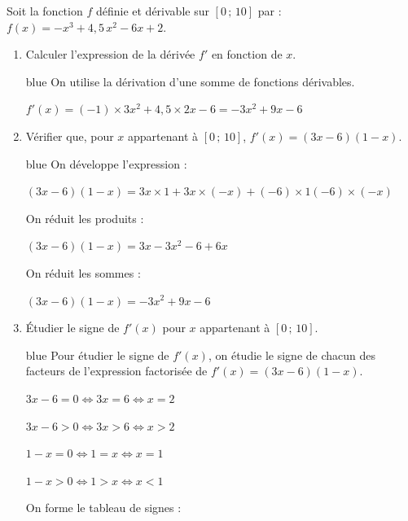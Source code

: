 Soit la fonction $f$ définie et dérivable sur $[0\,;\,10]$ par :\quad $f(x)=-x^{3}+4{,}5\,x^{2}-6x+2$.
	
	\begin{enumerate}
		\item Calculer l'expression de la dérivée $f'$ en fonction de $x$.
		
		\begin{color}{blue}
		On utilise la dérivation d'une somme de fonctions dérivables.
		
		$f'(x)=(-1)\times 3x^{2} + 4{,}5\times 2x - 6  = -3x^2 + 9x - 6$
		
		\end{color}
		
		
		\item Vérifier que, pour $x$ appartenant à $[0\,;\,10]$, $f'(x)=(3x-6)(1-x)$.

		\begin{color}{blue}
		On développe l'expression :
		
		\(
		(3x-6)(1-x) = 3x\times 1 +3x\times (-x) + (-6)\times 1 (-6)\times (-x) 
		\)
		
		On réduit les produits :
		
		\(
		(3x-6)(1-x) = 3x -3x^2 - 6 + 6x 
		\)
		
		
		On réduit les sommes :

		\(
		(3x-6)(1-x) = -3x^2 + 9x - 6  
		\)
		
				
		\end{color}
		
		\item Étudier le signe de $f'(x)$ pour $x$ appartenant à $[0\,;\,10]$.
		
		\begin{color}{blue}
		Pour étudier le signe de $f'(x)$, on étudie le signe de chacun des facteurs de l'expression factorisée de $f'(x)=(3x-6)(1-x)$.
		
		$3x - 6 = 0 \iff 3x = 6 \iff x = 2$
		
		$3x - 6 > 0 \iff 3x > 6 \iff x > 2$
		
		$1 - x = 0 \iff 1 = x \iff x = 1$
		
		$1 - x > 0 \iff 1 > x \iff x < 1$
		
		On forme le tableau de signes :
		
		
		\begin{center}
		\end{center}
		

\end{color}
\end{enumerate}
